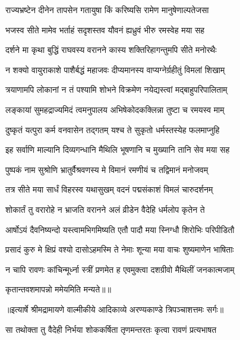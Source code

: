 \twolineshloka
{राज्यभ्रष्टेन दीनेन तापसेन गतायुषा}
{किं करिष्यसि रामेण मानुषेणाल्पतेजसा} %

\twolineshloka
{भजस्व सीते मामेव भर्ताहं सदृशस्तव}
{यौवनं ह्यध्रुवं भीरु रमस्वेह मया सह} %

\twolineshloka
{दर्शने मा कृथा बुद्धिं राघवस्य वरानने}
{कास्य शक्तिरिहागन्तुमपि सीते मनोरथैः} %

\twolineshloka
{न शक्यो वायुराकाशे पाशैर्बद्धं महाजवः}
{दीप्यमानस्य वाप्यग्नेर्ग्रहीतुं विमलां शिखाम्} %

\twolineshloka
{त्रयाणामपि लोकानां न तं पश्यामि शोभने}
{विक्रमेण नयेद्यस्त्वां मद्बाहुपरिपालिताम्} %

\twolineshloka
{लङ्कायां सुमहद्राज्यमिदं त्वमनुपालय}
{अभिषेकोदकक्लिन्ना तुष्टा च रमयस्व माम्} %

\twolineshloka
{दुष्कृतं यत्पुरा कर्म वनवासेन तद्गतम्}
{यश्च ते सुकृतो धर्मस्तस्येह फलमाप्नुहि} %

\twolineshloka
{इह सर्वाणि माल्यानि दिव्यगन्धानि मैथिलि}
{भूषणानि च मुख्यानि तानि सेव मया सह} %

\twolineshloka
{पुष्पकं नाम सुश्रोणि भ्रातुर्वैश्रवणस्य मे}
{विमानं रमणीयं च तद्विमानं मनोजवम्} %

\twolineshloka
{तत्र सीते मया सार्धं विहरस्व यथासुखम्}
{वदनं पद्मसंकाशं विमलं चारुदर्शनम्} %

\twolineshloka
{शोकार्तं तु वरारोहे न भ्राजति वरानने}
{अलं व्रीडेन वैदेहि धर्मलोप कृतेन ते} %

\twolineshloka
{आर्षोऽयं दैवनिष्यन्दो यस्त्वामभिगमिष्यति}
{एतौ पादौ मया स्निग्धौ शिरोभिः परिपीडितौ} %

\twolineshloka
{प्रसादं कुरु मे क्षिप्रं वश्यो दासोऽहमस्मि ते}
{नेमाः शून्या मया वाचः शुष्यमाणेन भाषिताः} %

\twolineshloka
{न चापि रावणः कांचिन्मूर्ध्ना स्त्रीं प्रणमेत ह}
{एवमुक्त्वा दशग्रीवो मैथिलीं जनकात्मजाम्} %

{कृतान्तवशमापन्नो ममेयमिति मन्यते॥॥} %

\addtocounter{shlokacount}{1}


{॥इत्यार्षे श्रीमद्रामायणे वाल्मीकीये आदिकाव्ये अरण्यकाण्डे त्रिपञ्चाशत्तमः सर्गः॥}


\twolineshloka
{सा तथोक्ता तु वैदेही निर्भया शोककर्षिता}
{तृणमन्तरतः कृत्वा रावणं प्रत्यभाषत} %

